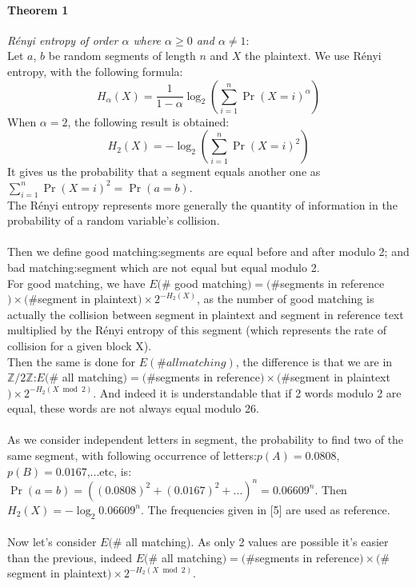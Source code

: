 \documentclass{article}
\begin{document}
\paragraph{Theorem 1}\textit{R\'enyi entropy of order $\alpha$ where $\alpha \geq 0$ and $\alpha \neq 1$}:
\\
Let $a$, $b$ be random segments of length $n$ and $X$ the plaintext. We use R\'enyi entropy, with the following formula:\\
$$H_{\alpha}(X) = \frac{1}{1-\alpha}\log_{2}(\sum_{i=1}^{n}{\Pr(X=i)^{\alpha}})$$ 
When $\alpha = 2$, the following result is obtained:
$$H_{2}(X) = -\log_{2}(\sum_{i=1}^{n}{\Pr(X=i)^{2}})$$
It gives us the probability that a segment equals another one as $\sum_{i=1}^{n}{\Pr(X=i)^{2}} =\Pr(a=b)$.\\
The R\'enyi entropy represents more generally the quantity of information in the probability of a random variable's collision.\\
\\
Then we define good matching:segments are equal before and after modulo 2; and bad matching:segment which are not equal but equal modulo 2.\\
${}$\hspace{1em}For good matching, we have $E(\#$ good matching$) = (\# $segments in reference$) \times (\#$segment in plaintext$) \times 2^{-H_{2}(X)}$, as the number of good matching is actually the collision between segment in plaintext and segment in reference text multiplied by the R\'enyi entropy of this segment (which represents the rate of collision for a given block X).\\
Then the same is done for  $E(\# all matching)$, the difference is that we are in $\mathbb{Z}/2\mathbb{Z}$:$E(\#$ all matching$) = (\# $segments in reference$) \times (\#$segment in plaintext$) \times 2^{-H_{2}(X \bmod 2)}$. And indeed it is understandable that if 2 words modulo 2 are equal, these words are not always equal modulo 26.\\
\\
As we consider independent letters in segment, the probability to find two of the same segment, with following occurrence of letters:$p(A)=0.0808$, $p(B)=0.0167$,...etc, is:$\Pr(a=b)=((0.0808)^{2} +(0.0167)^{2} +...)^{n} =0.06609^{n}$. Then $H_{2}(X) = -\log_{2}0.06609^{n}$. The frequencies given in [5] are used as reference.\\
\\
${}$\hspace{1em}Now let's consider $E(\#$ all matching). As only 2 values are possible it's easier than the previous, indeed $E(\#$ all matching$) =(\# $segments in reference$) \times (\#$segment in plaintext$) \times 2^{-H_{2}(X \bmod 2)}$.\\
\end{document}
